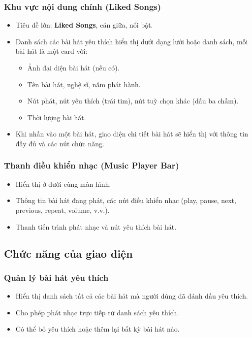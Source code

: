 \documentclass{book}
\begin{document}
\subsubsection{Khu vực nội dung chính (Liked Songs)}
\begin{itemize}
    \item Tiêu đề lớn: \textbf{Liked Songs}, căn giữa, nổi bật.
    \item Danh sách các bài hát yêu thích hiển thị dưới dạng lưới hoặc danh sách, mỗi bài hát là một card với:
    \begin{itemize}
        \item Ảnh đại diện bài hát (nếu có).
        \item Tên bài hát, nghệ sĩ, năm phát hành.
        \item Nút phát, nút yêu thích (trái tim), nút tuỳ chọn khác (dấu ba chấm).
        \item Thời lượng bài hát.
    \end{itemize}
    \item Khi nhấn vào một bài hát, giao diện chi tiết bài hát sẽ hiển thị với thông tin đầy đủ và các nút chức năng.
\end{itemize}

\subsubsection{Thanh điều khiển nhạc (Music Player Bar)}
\begin{itemize}
    \item Hiển thị ở dưới cùng màn hình.
    \item Thông tin bài hát đang phát, các nút điều khiển nhạc (play, pause, next, previous, repeat, volume, v.v.).
    \item Thanh tiến trình phát nhạc và nút yêu thích bài hát.
\end{itemize}

\subsection{Chức năng của giao diện}

\subsubsection{Quản lý bài hát yêu thích}
\begin{itemize}
    \item Hiển thị danh sách tất cả các bài hát mà người dùng đã đánh dấu yêu thích.
    \item Cho phép phát nhạc trực tiếp từ danh sách yêu thích.
    \item Có thể bỏ yêu thích hoặc thêm lại bất kỳ bài hát nào.
\end{itemize}
\end{document}

